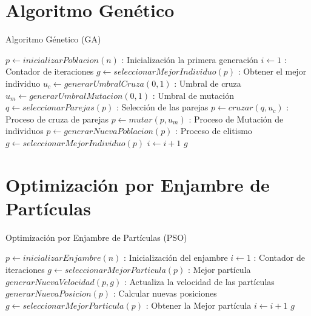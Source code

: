 \documentclass[10pt,letterpaper,twoside,openright]{article}
\begin{document}
		 \newpage
	
	\section{Algoritmo Genético}
	
		\begin{algorithm}[H]
			\caption{Algoritmo Génetico (GA)}
				$ p \leftarrow inicializarPoblacion(n)$ : Inicialización la primera generación\;
				$ i \leftarrow 1 $ : Contador de iteraciones\;
				$ g \leftarrow seleccionarMejorIndividuo(p) $ : Obtener el mejor individuo\;
				$ u_{c} \leftarrow generarUmbralCruza(0,1) $ : Umbral de cruza\;
				$ u_{m} \leftarrow generarUmbralMutacion(0,1) $ : Umbral de mutación\;
				{
					$ q \leftarrow seleccionarParejas(p) $ : Selección de las parejas\;
					$ p \leftarrow cruzar(q,u_{c}) $ : Proceso de cruza de parejas\;
					$ p \leftarrow mutar(p,u_{m}) $ : Proceso de Mutación de individuos\;
					$ p \leftarrow generarNuevaPoblacion(p) $ : Proceso de elitismo\;
					$ g \leftarrow seleccionarMejorIndividuo(p) $\;
					$ i \leftarrow  i + 1 $\;
				}
		 		\Return $ g $
		 \end{algorithm}
		 
		 \newpage
	
	\section{Optimización por Enjambre de Partículas}
	
		\begin{algorithm}[H]
			\caption{Optimización por Enjambre de Partículas (PSO)}
				$ p \leftarrow inicializarEnjambre(n)$ : Inicialización del enjambre\;
				$ i \leftarrow 1 $ : Contador de iteraciones\;
				$ g \leftarrow seleccionarMejorParticula(p) $ : Mejor partícula\;
				{
					$ generarNuevaVelocidad(p,g) $ : Actualiza la velocidad de las partículas\;
					$ generarNuevaPosicion(p) $ : Calcular nuevas posiciones\;
					$ g \leftarrow seleccionarMejorParticula(p) $ : Obtener la Mejor partícula\;
					$ i \leftarrow  i + 1 $\;
				}
		 		\Return $ g $
		 \end{algorithm}
		 
\end{document}
